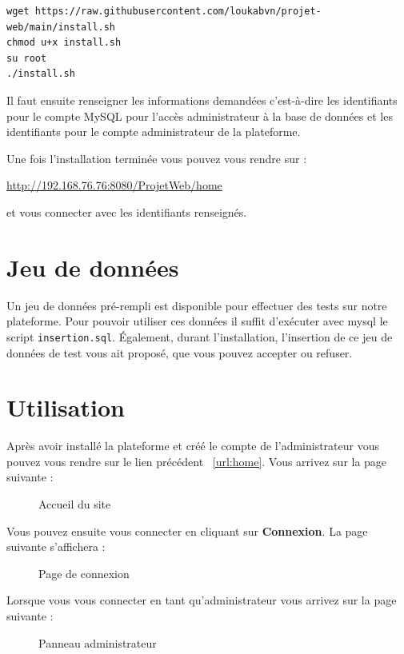 \begin{verbatim}
wget https://raw.githubusercontent.com/loukabvn/projet-web/main/install.sh
chmod u+x install.sh
su root
./install.sh
\end{verbatim}

Il faut ensuite renseigner les informations demandées c'est-à-dire les identifiants pour le
compte MySQL pour l'accès administrateur à la base de données et les identifiants pour le compte
administrateur de la plateforme.

Une fois l'installation terminée vous pouvez vous rendre sur :
\begin{center}
    \label{url:home}
    \url{http://192.168.76.76:8080/ProjetWeb/home}
\end{center}
et vous connecter avec les identifiants renseignés.

\section{Jeu de données}

Un jeu de données pré-rempli est disponible pour effectuer des tests sur notre plateforme.
Pour pouvoir utiliser ces données il suffit d'exécuter avec mysql le script \verb:insertion.sql:.
Également, durant l'installation, l'insertion de ce jeu de données de test vous ait proposé, que
vous pouvez accepter ou refuser.
\newpage

\section{Utilisation}

Après avoir installé la plateforme et créé le compte de l'administrateur vous pouvez vous rendre
sur le lien précédent ~\ref{url:home}. Vous arrivez sur la page suivante :

\begin{figure}[h]
    \centering
    \caption{Accueil du site}
\end{figure}

Vous pouvez ensuite vous connecter en cliquant sur \textbf{Connexion}. La page suivante
s'affichera :
\begin{figure}[h]
    \centering
    \caption{Page de connexion}
\end{figure}

Lorsque vous vous connecter en tant qu'administrateur vous arrivez sur la page suivante :
\begin{figure}[h]
    \centering
    \caption{Panneau administrateur}
\end{figure}

